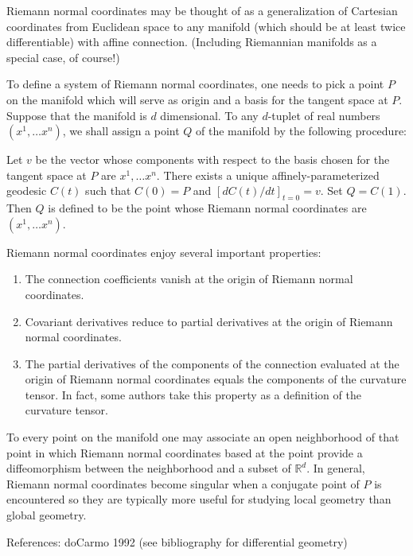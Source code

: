 \documentclass[12pt]{article}
\begin{document}
Riemann normal coordinates may be thought of as a generalization of Cartesian coordinates from Euclidean space to any manifold (which should be at least twice differentiable) with affine connection.  (Including Riemannian manifolds as a special case, of course!)

To define a system of Riemann normal coordinates, one needs to pick a point $P$ on the manifold which will serve as origin and a basis for the tangent space at $P$.  Suppose that the manifold is $d$ dimensional.  To any $d$-tuplet of real numbers $(x^1, \ldots x^n)$, we shall assign a point $Q$ of the manifold by the following procedure:

Let $v$ be the vector whose components with respect to the basis chosen for the tangent space at $P$ are $x^1, \ldots x^n$.  There exists a unique affinely-parameterized geodesic $C(t)$ such that $C(0) = P$ and $[d C(t) / dt]_{t = 0} = v$.  Set $Q = C(1)$.  Then $Q$ is defined to be the point whose Riemann normal coordinates are $(x^1, \ldots x^n)$.

Riemann normal coordinates enjoy several important properties:

\begin{enumerate}
\item The connection coefficients vanish at the origin of Riemann normal coordinates.

\item Covariant derivatives reduce to partial derivatives at the origin of Riemann normal coordinates.

\item The partial derivatives of the components of the connection evaluated at the origin of Riemann normal coordinates equals the components of the curvature tensor.  In fact, some authors take this property as a definition of the curvature tensor.
\end{enumerate}

To every point on the manifold one may associate an open neighborhood of that point in which Riemann normal coordinates based at the point provide a diffeomorphism between the neighborhood and a subset of $\mathbb{R}^d$.  In general, Riemann normal coordinates become singular when a conjugate point of $P$ is encountered so they are typically more useful for studying local geometry than global geometry.

References: 
doCarmo 1992 (see bibliography for differential geometry)
\end{document}
